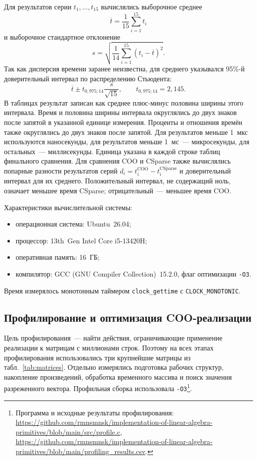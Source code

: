 \documentclass[a4paper]{article}
\begin{document}
Для результатов серии $t_1,\ldots,t_{15}$ вычислялись выборочное среднее
\[
\overline{t}=\frac{1}{15}\sum_{i=1}^{15}t_i
\]
и выборочное стандартное отклонение
\[
s=\sqrt{\frac{1}{14}\sum_{i=1}^{15}(t_i-\overline{t})^2}.
\]
Так как дисперсия времени заранее неизвестна, для среднего указывался 95\%-й доверительный интервал по распределению Стьюдента:
\[
\overline{t}\pm t_{0{,}975;14}\frac{s}{\sqrt{15}}, \qquad t_{0{,}975;14}=2{,}145.
\]
В таблицах результат записан как среднее плюс-минус половина ширины этого интервала. Время и половина ширины интервала округлялись до двух знаков после запятой в указанной единице измерения. Проценты и отношения времён также округлялись до двух знаков после запятой. Для результатов меньше 1~мкс используются наносекунды, для результатов меньше 1~мс~--- микросекунды, для остальных~--- миллисекунды. Единица указана в каждой строке таблиц финального сравнения. Для сравнения COO и CSparse также вычислялись попарные разности результатов серий $d_i=t_i^{\mathrm{COO}}-t_i^{\mathrm{CSparse}}$ и доверительный интервал для их среднего. Положительный интервал, не содержащий ноль, означает меньшее время CSparse; отрицательный~--- меньшее время COO.

Характеристики вычислительной системы:
\begin{itemize}
\item операционная система: Ubuntu~26.04;
\item процессор: 13th~Gen Intel Core i5-13420H;
\item оперативная память: 16~ГБ;
\item компилятор: GCC (GNU Compiler Collection)~15.2.0, флаг оптимизации \texttt{-O3}.
\end{itemize}
Время измерялось монотонным таймером \texttt{clock\_gettime} с \texttt{CLOCK\_MONOTONIC}.

\subsection{Профилирование и оптимизация COO-реализации}
Цель профилирования~--- найти действия, ограничивающие применение реализации к матрицам с миллионами строк. Поэтому на всех этапах профилирования использовались три крупнейшие матрицы из табл.~\ref{tab:matrices}. Отдельно измерялись подготовка рабочих структур, накопление произведений, обработка временного массива и поиск значения разреженного вектора. Профильная сборка использовала \texttt{-O3}\footnote{Программа и исходные результаты профилирования: \url{https://github.com/rmnsmnsk/implementation-of-linear-algebra-primitives/blob/main/src/profile.c}, \url{https://github.com/rmnsmnsk/implementation-of-linear-algebra-primitives/blob/main/profiling_results.csv}.}.
\end{document}
